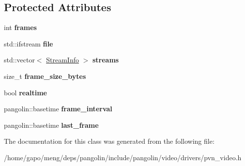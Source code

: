 \subsection*{Protected Attributes}
\begin{DoxyCompactItemize}
\item 
int {\bfseries frames}\hypertarget{classpangolin_1_1_pvn_video_ac992b2df415c30dfc12f2a06b453c0d5}{}\label{classpangolin_1_1_pvn_video_ac992b2df415c30dfc12f2a06b453c0d5}

\item 
std\+::ifstream {\bfseries file}\hypertarget{classpangolin_1_1_pvn_video_a9176e1821e47a7aab33ebe1a77d1a00c}{}\label{classpangolin_1_1_pvn_video_a9176e1821e47a7aab33ebe1a77d1a00c}

\item 
std\+::vector$<$ \hyperlink{classpangolin_1_1_stream_info}{Stream\+Info} $>$ {\bfseries streams}\hypertarget{classpangolin_1_1_pvn_video_a843d63896c9aac7c0979f6b18e2bb750}{}\label{classpangolin_1_1_pvn_video_a843d63896c9aac7c0979f6b18e2bb750}

\item 
size\+\_\+t {\bfseries frame\+\_\+size\+\_\+bytes}\hypertarget{classpangolin_1_1_pvn_video_a6c20ee585d2b7b211fc0bb14d76e657e}{}\label{classpangolin_1_1_pvn_video_a6c20ee585d2b7b211fc0bb14d76e657e}

\item 
bool {\bfseries realtime}\hypertarget{classpangolin_1_1_pvn_video_a9fc8db20cd07ad434e7388370d1372e5}{}\label{classpangolin_1_1_pvn_video_a9fc8db20cd07ad434e7388370d1372e5}

\item 
pangolin\+::basetime {\bfseries frame\+\_\+interval}\hypertarget{classpangolin_1_1_pvn_video_a961ef0dba437cdd274c5539dd4198374}{}\label{classpangolin_1_1_pvn_video_a961ef0dba437cdd274c5539dd4198374}

\item 
pangolin\+::basetime {\bfseries last\+\_\+frame}\hypertarget{classpangolin_1_1_pvn_video_a8fca6c98411066d3e4cef526e8ad1d94}{}\label{classpangolin_1_1_pvn_video_a8fca6c98411066d3e4cef526e8ad1d94}

\end{DoxyCompactItemize}


The documentation for this class was generated from the following file\+:\begin{DoxyCompactItemize}
\item 
/home/gapo/meng/deps/pangolin/include/pangolin/video/drivers/pvn\+\_\+video.\+h\end{DoxyCompactItemize}
